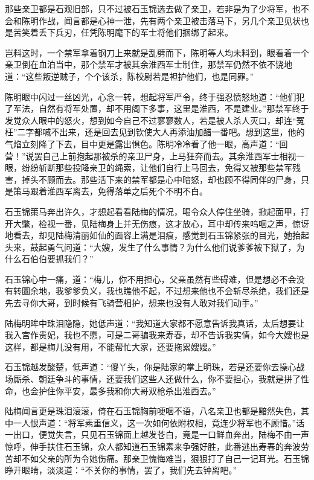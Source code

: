 那些亲卫都是石观旧部，只不过被石玉锦选去做了亲卫，若非是为了少将军，也不会和陈明作战，闻言都是心神一泄，先有两个亲卫被击落马下，另几个亲卫见状也是苦笑着丢下兵刃，任凭陈明麾下的军士将他们捆绑了起来。

岂料这时，一个禁军拿着钢刀上来就是乱劈而下，陈明等人均未料到，眼看着一个亲卫倒在血泊当中，那个禁军才被其余淮西军士制住，那禁军仍然不依不饶地道：“这些叛逆贼子，个个该杀，陈校尉若是袒护他们，也是同罪。”

陈明眼中闪过一丝凶光，心念一转，想起将军严令，终于强忍愤怒地道：“他们犯了军法，自然有将军处置，却不用阁下多事，这里是淮西，不是建业。”那禁军终于发觉众人眼中的怒火，想到如今自己不过寥寥数人，若是被人杀人灭口，却连“冤枉”二字都喊不出来，还是回去见到钦使大人再添油加醋一番吧。想到这里，他的气焰立刻降了下去，目中更是露出惧色。陈明冷冷看了他一眼，高声道：“回营！”说罢自己上前抱起那被杀的亲卫尸身，上马狂奔而去。其余淮西军士相视一眼，纷纷斩断那些投降亲卫的绳索，让他们自行上马回去，免得又被那些禁军残害，掉头不顾而去。那些活下来的禁军都是心中暗怒，却也顾不得同伴的尸身，只是策马跟着淮西军离去，免得落单之后死个不明不白。

石玉锦策马奔出许久，才想起看看陆梅的情况，喝令众人停住坐骑，掀起面甲，打开大氅，检视一番，见陆梅身上并无伤痕，这才放心，耳中却传来呜咽之声，惊讶地看去，却见陆梅清丽如仙的面容上满是泪痕，感觉到石玉锦紧张的目光，她抬起头来，鼓起勇气问道：“大嫂，发生了什么事情？为什么他们说爹爹被下狱了，为什么石伯伯要抓我们？”

石玉锦心中一痛，道：“梅儿，你不用担心，父亲虽然有些碍难，但是想必不会没有转圜余地，我爹爹负义，我也瞧他不起，不过想来他也不会斩尽杀绝，我们还是先去寻你大哥，到时候有飞骑营相护，想来也没有人敢对我们动手。”

陆梅明眸中珠泪隐隐，她低声道：“我知道大家都不愿意告诉我真话，太后想要让我入宫作贵妃，我也不愿，可是二哥骗我来寿春，却不告诉我实情，如今大嫂也是这样，都是梅儿没有用，不能帮忙大家，还要拖累嫂嫂。”

石玉锦越发酸楚，低声道：“傻丫头，你是陆家的掌上明珠，若是还要你去操心战场厮杀、朝廷争斗的事情，还要我们这些人还做什么，你不要担心，我就是拼了性命，也会护住你平安，最多我和你大哥双枪杀出淮西去。”

陆梅闻言更是珠泪滚滚，倚在石玉锦胸前哽咽不语，八名亲卫也都是黯然失色，其中一人恨声道：“将军素重信义，这一次如何依附权相，竟连少将军也不顾惜。”话一出口，便觉失言，只见石玉锦面上越发苍白，竟是一口鲜血奔出，陆梅不由一声惊呼，伸手扶住石玉锦，众人都知道石玉锦素来争强好胜，此番逃出寿春的奔波劳苦却不如父亲的所为令她伤痛。那亲卫愧悔难当，狠狠打了自己一记耳光。石玉锦睁开眼睛，淡淡道：“不关你的事情，罢了，我们先去钟离吧。”

